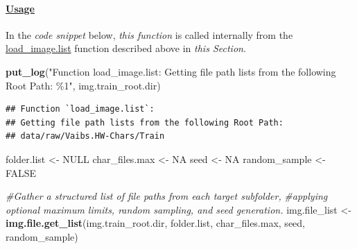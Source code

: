 \documentclass[
]{report}
\newenvironment{Shaded}{\begin{snugshade}}{\end{snugshade}}
\newcommand{\CommentTok}[1]{\textcolor[rgb]{0.56,0.35,0.01}{\textit{#1}}}
\newcommand{\ConstantTok}[1]{\textcolor[rgb]{0.56,0.35,0.01}{#1}}
\newcommand{\FunctionTok}[1]{\textcolor[rgb]{0.13,0.29,0.53}{\textbf{#1}}}
\newcommand{\NormalTok}[1]{#1}
\newcommand{\OtherTok}[1]{\textcolor[rgb]{0.56,0.35,0.01}{#1}}
\newcommand{\StringTok}[1]{\textcolor[rgb]{0.31,0.60,0.02}{#1}}
\begin{document}
\protect{}\label{func.img.file.get_list.usage}
\paragraph{\texorpdfstring{\href{https://github.com/AzKurban-edX-DS/edx.capstone.choose-your-own/blob/main/r/support-functions/data-helper.R\#L}{Usage}}{Usage}}\label{usage-2}

\hfill\break

\begin{noteblock}
In the \emph{code snippet} below, \emph{this function} is called internally from the \hyperref[func.load_image.list]{load\_image.list} function described above in \emph{this Section}.

\end{noteblock}

\begin{Shaded}
\begin{Highlighting}[]
\FunctionTok{put\_log}\NormalTok{(}\StringTok{"Function \textasciigrave{}load\_image.list\textasciigrave{}:}
\StringTok{Getting file path lists from the following Root Path:}
\StringTok{\%1"}\NormalTok{, img.train\_root.dir)}
\end{Highlighting}
\end{Shaded}

\begin{verbatim}
## Function `load_image.list`:
## Getting file path lists from the following Root Path:
## data/raw/Vaibs.HW-Chars/Train
\end{verbatim}

\begin{Shaded}
\begin{Highlighting}[]
\NormalTok{folder.list }\OtherTok{\textless{}{-}} \ConstantTok{NULL} 
\NormalTok{char\_files.max }\OtherTok{\textless{}{-}} \ConstantTok{NA}
\NormalTok{seed }\OtherTok{\textless{}{-}} \ConstantTok{NA}
\NormalTok{random\_sample }\OtherTok{\textless{}{-}} \ConstantTok{FALSE}


\CommentTok{\#\textquotesingle{}Gather a structured list of file paths from each target subfolder, }
\CommentTok{\#\textquotesingle{}applying optional maximum limits, random sampling, and seed generation. }
\NormalTok{img.file\_list }\OtherTok{\textless{}{-}} \FunctionTok{img.file.get\_list}\NormalTok{(img.train\_root.dir, }
\NormalTok{                                        folder.list,}
\NormalTok{                                        char\_files.max,}
\NormalTok{                                        seed,}
\NormalTok{                                        random\_sample)}
\end{Highlighting}
\end{Shaded}
\end{document}
